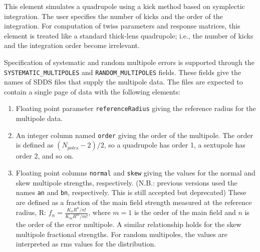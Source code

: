 This element simulates a quadrupole using a kick method based on
symplectic integration.  The user specifies the number of kicks and
the order of the integration.  For computation of twiss parameters and
response matrices, this element is treated like a standard thick-lens
quadrupole; i.e., the number of kicks and the integration order become
irrelevant.

\begin{raggedright}
Specification of systematic and random multipole errors is supported
through the \verb|SYSTEMATIC_MULTIPOLES| and 
\verb|RANDOM_MULTIPOLES|
fields.  These fields give the names of SDDS files that supply the
multipole data.  The files are expected to contain a single page of
data with the following elements:
\end{raggedright}
\begin{enumerate}
\item Floating point parameter {\tt referenceRadius} giving the reference
 radius for the multipole data.
\item An integer column named {\tt order} giving the order of the multipole.
The order is defined as $(N_{poles}-2)/2$, so a quadrupole has order 1, a
sextupole has order 2, and so on.
\item Floating point columns {\tt normal} and {\tt skew} giving the values for the
normal and skew multipole strengths, respectively.  
(N.B.: previous versions used the names {\tt an} and {\tt bn}, respectively. This is still accepted but deprecated)
These are defined as a fraction 
of the main field strength measured at the reference radius, R: 
$f_n  = \frac{K_n R^n / n!}{K_m R^m / m!}$, where 
$m=1$ is the order of the main field and $n$ is the order of the error multipole.
A similar relationship holds for the skew multipole fractional strengths.
For random multipoles, the values are interpreted as rms values for the distribution.
\end{enumerate}

